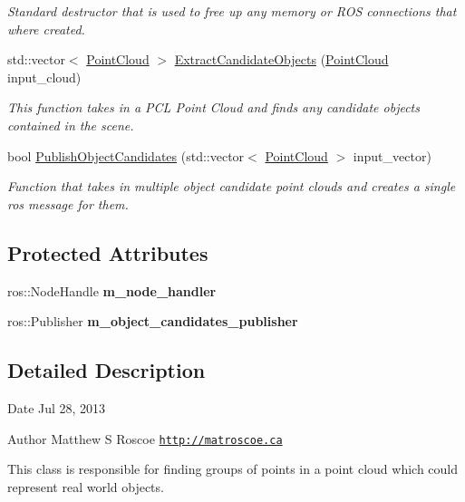 \begin{DoxyCompactItemize}
\begin{DoxyCompactList}\small\item\em \-Standard destructor that is used to free up any memory or \-R\-O\-S connections that where created. \end{DoxyCompactList}\item 
std\-::vector$<$ \hyperlink{_helper_functions_8hpp_abb956d1047f4dd2c956fe3cb0dd0004d}{\-Point\-Cloud} $>$ \hyperlink{class_object_candidate_extractor_a6a4adbcec19f94bc6073a4b2c2fa6f66}{\-Extract\-Candidate\-Objects} (\hyperlink{_helper_functions_8hpp_abb956d1047f4dd2c956fe3cb0dd0004d}{\-Point\-Cloud} input\-\_\-cloud)
\begin{DoxyCompactList}\small\item\em \-This function takes in a \-P\-C\-L \-Point \-Cloud and finds any candidate objects contained in the scene. \end{DoxyCompactList}\item 
bool \hyperlink{class_object_candidate_extractor_ab8848f6d86f7d7798ea30c2e04ae8b59}{\-Publish\-Object\-Candidates} (std\-::vector$<$ \hyperlink{_helper_functions_8hpp_abb956d1047f4dd2c956fe3cb0dd0004d}{\-Point\-Cloud} $>$ input\-\_\-vector)
\begin{DoxyCompactList}\small\item\em \-Function that takes in multiple object candidate point clouds and creates a single ros message for them. \end{DoxyCompactList}\end{DoxyCompactItemize}
\subsection*{\-Protected \-Attributes}
\begin{DoxyCompactItemize}
\item 
\hypertarget{class_object_candidate_extractor_a9a0da45687232f96360f76175a3cb097}{ros\-::\-Node\-Handle {\bfseries m\-\_\-node\-\_\-handler}}\label{class_object_candidate_extractor_a9a0da45687232f96360f76175a3cb097}

\item 
\hypertarget{class_object_candidate_extractor_a3b5cd0451266eafe0aba2d950a7434e8}{ros\-::\-Publisher {\bfseries m\-\_\-object\-\_\-candidates\-\_\-publisher}}\label{class_object_candidate_extractor_a3b5cd0451266eafe0aba2d950a7434e8}

\end{DoxyCompactItemize}


\subsection{\-Detailed \-Description}
\begin{DoxyDate}{\-Date}
\-Jul 28, 2013 
\end{DoxyDate}
\begin{DoxyAuthor}{\-Author}
\-Matthew \-S \-Roscoe \href{http://matroscoe.ca}{\tt http\-://matroscoe.\-ca}
\end{DoxyAuthor}
\-This class is responsible for finding groups of points in a point cloud which could represent real world objects. 

